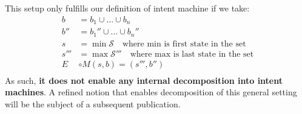 This setup only fulfills our definition of intent machine if we take:
\begin{equation}
    \begin{aligned}
        b &= b_1 \cup \dots \cup b_n \\
        b'' &= b_1'' \cup \dots \cup b_n'' \\
        s &= \min \mathcal{S} \quad \text{where min is first state in the set}\\
        s''' &= \max \mathcal{S'''} \quad \text{where max is last state in the set}\\
        E &\circ M(s, b) = (s''', b'')\\
    \end{aligned}
\end{equation}
As such, \textbf{it does not enable any internal decomposition into intent machines}. A refined notion that enables decomposition of this general setting will be the subject of a subsequent publication. 











